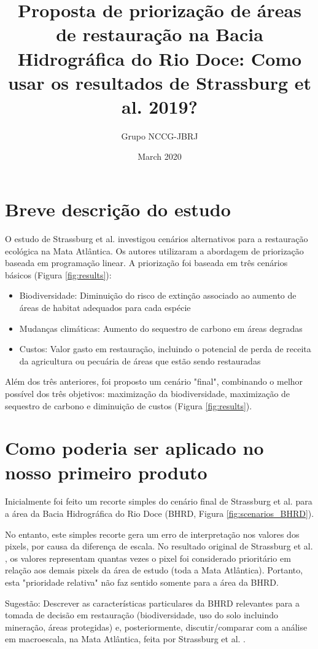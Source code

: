 \documentclass{article}
\title{Proposta de priorização de áreas de restauração na Bacia Hidrográfica do Rio Doce: Como usar os resultados de Strassburg et al. 2019?}
\author{Grupo NCCG-JBRJ}
\date{March 2020}
\begin{document}
\maketitle

\section{Breve descrição do estudo}
O estudo de Strassburg et al. \cite{Strassburg2019} investigou cenários alternativos para a restauração ecológica na Mata Atlântica. Os autores utilizaram a abordagem de priorização baseada em programação linear. A priorização foi baseada em três cenários básicos (Figura \ref{fig:results}): 

\begin{itemize}
    \item Biodiversidade: Diminuição do risco  de extinção associado ao aumento de áreas de habitat adequados para cada espécie
    \item Mudanças climáticas: Aumento do sequestro de carbono em áreas degradas
    \item Custos: Valor gasto em restauração, incluindo o potencial de perda de receita da agricultura ou pecuária de áreas que estão sendo restauradas
\end{itemize}
 
Além dos três anteriores, foi proposto um cenário "final", combinando o melhor possível dos três objetivos: maximização da biodiversidade, maximização de sequestro de carbono e diminuição de custos (Figura \ref{fig:results}).

\section{Como poderia ser aplicado no nosso primeiro produto}
Inicialmente foi feito um recorte simples do cenário final de Strassburg et al. \cite{Strassburg2019} para a área da Bacia Hidrográfica do Rio Doce (BHRD, Figura \ref{fig:scenarios_BHRD}).

No entanto, este simples recorte gera um erro de interpretação nos valores dos pixels, por causa da diferença de escala. No resultado original de Strassburg et al. \cite{Strassburg2019}, os valores representam quantas vezes o pixel foi considerado prioritário em relação aos demais pixels da área de estudo (toda a Mata Atlântica). Portanto, esta "prioridade relativa" não faz sentido somente para a área da BHRD.

Sugestão: Descrever as características particulares da BHRD relevantes para a tomada de decisão em restauração (biodiversidade, uso do solo incluindo mineração, áreas protegidas) e, posteriormente, discutir/comparar com a análise em macroescala, na Mata Atlântica, feita por Strassburg et al. \cite{Strassburg2019}.
\end{document}
